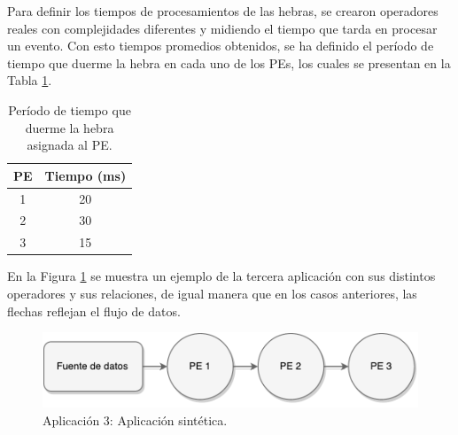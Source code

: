
Para definir los tiempos de procesamientos de las hebras, se crearon operadores reales con complejidades diferentes y midiendo el tiempo que tarda en procesar un evento. Con esto tiempos promedios obtenidos, se ha definido el per\'iodo de tiempo que duerme la hebra en cada uno de los PEs, los cuales se presentan en la Tabla \ref{tab:app3-time}.


\begin{table}[!ht]
\centering
\caption{Per\'iodo de tiempo que duerme la hebra asignada al PE.}
\begin{tabular}{| c | c |}
\hline
PE & Tiempo (ms) \\ \hline
1 & 20 \\
2 & 30 \\
3 & 15 \\\hline
\end{tabular}
\label{tab:app3-time}
\end{table}

En la Figura \ref{fig:terceraAplicacion} se muestra un ejemplo de la tercera aplicaci\'on con sus distintos operadores y sus relaciones, de igual manera que en los casos anteriores, las flechas reflejan el flujo de datos.

\begin{figure}[!ht]
	\centering
		\includegraphics[scale=0.6]{images/App3.pdf}
	\caption{Aplicaci\'on 3: Aplicaci\'on sint\'etica.}
	\label{fig:terceraAplicacion}
\end{figure}


